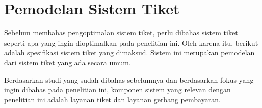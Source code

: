 \section{Pemodelan Sistem Tiket}
\label{apx:analisis-kebutuhan}

Sebelum membahas pengoptimalan sistem tiket, perlu dibahas sistem tiket seperti apa yang ingin dioptimalkan pada penelitian ini. Oleh karena itu, berikut adalah spesifikasi sistem tiket yang dimaksud. Sistem ini merupakan pemodelan dari sistem tiket yang ada secara umum.

Berdasarkan studi yang sudah dibahas sebelumnya dan berdasarkan fokus yang ingin dibahas pada penelitian ini, komponen sistem yang relevan dengan penelitian ini adalah layanan tiket dan layanan gerbang pembayaran.





